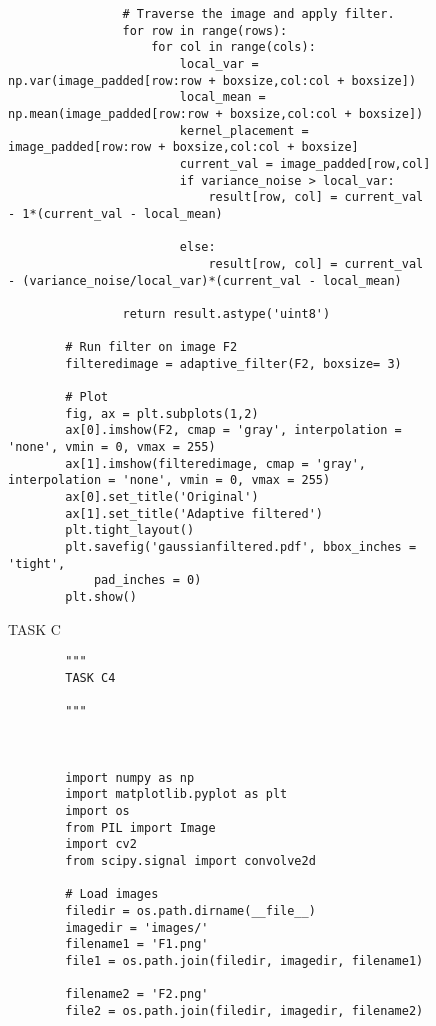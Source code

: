 {\begin{figure}[hbt!]
\begin{lstlisting}
                # Traverse the image and apply filter.
                for row in range(rows):
                    for col in range(cols):
                        local_var = np.var(image_padded[row:row + boxsize,col:col + boxsize])
                        local_mean = np.mean(image_padded[row:row + boxsize,col:col + boxsize])
                        kernel_placement = image_padded[row:row + boxsize,col:col + boxsize] 
                        current_val = image_padded[row,col]
                        if variance_noise > local_var:
                            result[row, col] = current_val - 1*(current_val - local_mean)
                        
                        else:
                            result[row, col] = current_val - (variance_noise/local_var)*(current_val - local_mean)
                
                return result.astype('uint8')
        
        # Run filter on image F2
        filteredimage = adaptive_filter(F2, boxsize= 3)
        
        # Plot
        fig, ax = plt.subplots(1,2)
        ax[0].imshow(F2, cmap = 'gray', interpolation = 'none', vmin = 0, vmax = 255)
        ax[1].imshow(filteredimage, cmap = 'gray', interpolation = 'none', vmin = 0, vmax = 255)
        ax[0].set_title('Original')
        ax[1].set_title('Adaptive filtered')
        plt.tight_layout()
        plt.savefig('gaussianfiltered.pdf', bbox_inches = 'tight',
            pad_inches = 0)
        plt.show()
    \end{lstlisting}
\caption{TASK C}
\label{TASK C}
\end{figure}


\begin{figure}[hbt!]
    \begin{lstlisting}
        """
        TASK C4
        
        """
        
        
        
        import numpy as np 
        import matplotlib.pyplot as plt
        import os
        from PIL import Image
        import cv2
        from scipy.signal import convolve2d
        
        # Load images
        filedir = os.path.dirname(__file__)
        imagedir = 'images/'
        filename1 = 'F1.png'
        file1 = os.path.join(filedir, imagedir, filename1)
        
        filename2 = 'F2.png'
        file2 = os.path.join(filedir, imagedir, filename2)
        

\end{lstlisting}
\end{figure}}
